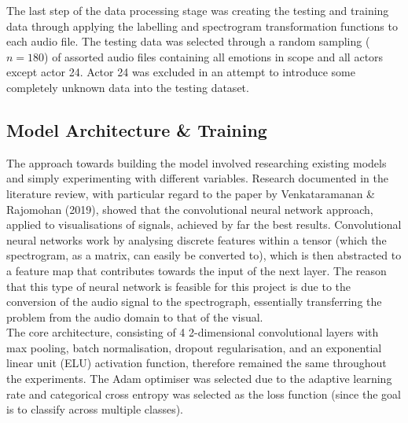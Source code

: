 \documentclass[12pt]{article}
\begin{document}
\noindent The last step of the data processing stage was creating the testing and training data through applying the labelling and spectrogram transformation functions to each audio file. The testing data was selected through a random sampling ($n = 180$) of assorted audio files containing all emotions in scope and all actors except actor 24. Actor 24 was excluded in an attempt to introduce some completely unknown data into the testing dataset.
\newpage
\subsection{Model Architecture \& Training}
The approach towards building the model involved researching existing models and simply experimenting with different variables. Research documented in the literature review, with particular regard to the paper by Venkataramanan \& Rajomohan (2019), showed that the convolutional neural network approach, applied to visualisations of signals, achieved by far the best results. Convolutional neural networks work by analysing discrete features within a tensor (which the spectrogram, as a matrix, can easily be converted to), which is then abstracted to a feature map that contributes towards the input of the next layer. The reason that this type of neural network is feasible for this project is due to the conversion of the audio signal to the spectrograph, essentially transferring the problem from the audio domain to that of the visual.
\\

\noindent The core architecture, consisting of 4 2-dimensional convolutional layers with max pooling, batch normalisation, dropout regularisation, and an exponential linear unit (ELU) activation function, therefore remained the same throughout the experiments. The Adam optimiser was selected due to the adaptive learning rate and categorical cross entropy was selected as the loss function (since the goal is to classify across multiple classes).
\\
\end{document}
